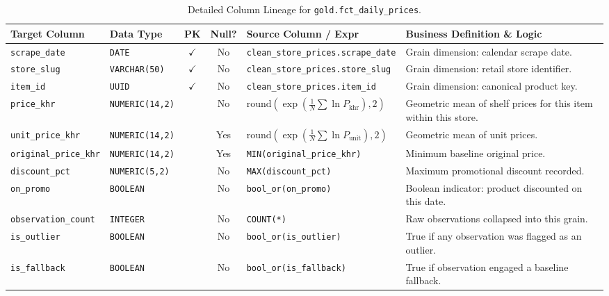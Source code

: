 \documentclass[a4paper, 11pt]{article}
\begin{document}
\begin{table}[H]
\centering
\small
\begin{tabularx}{\textwidth}{l p{2.5cm} c c p{4.5cm} X}
\toprule
\textbf{Target Column} & \textbf{Data Type} & \textbf{PK} & \textbf{Null?} & \textbf{Source Column / Expr} & \textbf{Business Definition \& Logic} \\
\midrule
\texttt{scrape\_date} & \texttt{DATE} & $\checkmark$ & No & \texttt{clean\_store\_prices.scrape\_date} & Grain dimension: calendar scrape date. \\
\texttt{store\_slug} & \texttt{VARCHAR(50)} & $\checkmark$ & No & \texttt{clean\_store\_prices.store\_slug} & Grain dimension: retail store identifier. \\
\texttt{item\_id} & \texttt{UUID} & $\checkmark$ & No & \texttt{clean\_store\_prices.item\_id} & Grain dimension: canonical product key. \\
\texttt{price\_khr} & \texttt{NUMERIC(14,2)} & & No & $\text{round}\left(\exp\left( \frac{1}{N}\sum\ln P_{\text{khr}} \right), 2\right)$ & Geometric mean of shelf prices for this item within this store. \\
\texttt{unit\_price\_khr} & \texttt{NUMERIC(14,2)} & & Yes & $\text{round}\left(\exp\left( \frac{1}{N}\sum\ln P_{\text{unit}} \right), 2\right)$ & Geometric mean of unit prices. \\
\texttt{original\_price\_khr} & \texttt{NUMERIC(14,2)} & & Yes & \texttt{MIN(original\_price\_khr)} & Minimum baseline original price. \\
\texttt{discount\_pct} & \texttt{NUMERIC(5,2)} & & No & \texttt{MAX(discount\_pct)} & Maximum promotional discount recorded. \\
\texttt{on\_promo} & \texttt{BOOLEAN} & & No & \texttt{bool\_or(on\_promo)} & Boolean indicator: product discounted on this date. \\
\texttt{observation\_count} & \texttt{INTEGER} & & No & \texttt{COUNT(*)} & Raw observations collapsed into this grain. \\
\texttt{is\_outlier} & \texttt{BOOLEAN} & & No & \texttt{bool\_or(is\_outlier)} & True if any observation was flagged as an outlier. \\
\texttt{is\_fallback} & \texttt{BOOLEAN} & & No & \texttt{bool\_or(is\_fallback)} & True if observation engaged a baseline fallback. \\
\bottomrule
\end{tabularx}
\caption{Detailed Column Lineage for \texttt{gold.fct\_daily\_prices}.}
\end{table}
\end{document}
